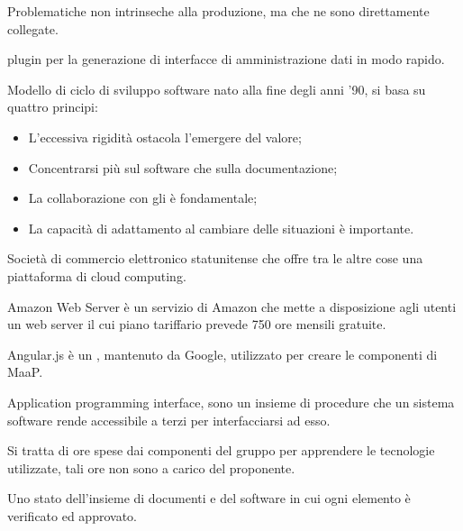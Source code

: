 





\makeFrontPage



\clearpage


Problematiche non intrinseche alla produzione, ma che ne sono direttamente collegate.

 plugin per la generazione di interfacce di amministrazione dati in modo rapido.

Modello di ciclo di sviluppo software nato alla fine degli anni '90, si basa su quattro principi:
\begin{itemize} 
 \item L'eccessiva rigidità ostacola l'emergere del valore;
 \item Concentrarsi più sul software che sulla documentazione;
 \item La collaborazione con gli  è fondamentale;
 \item La capacità di adattamento al cambiare delle situazioni è importante.
\end{itemize} 

Società di commercio elettronico statunitense che offre tra le altre cose una piattaforma di cloud computing.

Amazon Web Server è un servizio di Amazon che mette a disposizione agli utenti un web server il cui piano tariffario prevede 750 ore mensili gratuite.

Angular.js è un   , mantenuto da Google, utilizzato per creare le componenti  di MaaP.

Application programming interface, sono un insieme di procedure che un sistema software rende accessibile a terzi per interfacciarsi ad esso.

Si tratta di ore spese dai componenti del gruppo per apprendere le tecnologie utilizzate, tali ore non sono a carico del proponente.


Uno stato dell'insieme di documenti e del software in cui ogni elemento è verificato ed approvato.

